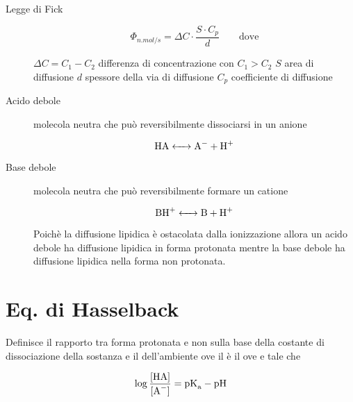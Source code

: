 
\begin{description}
\item[Legge di Fick]
$$ \Phi_{n.mol/s} = \Delta C \cdot \frac{S\cdot C_p}{d} \qquad\text{dove}$$

$\Delta C = C_1 - C_2$ differenza di concentrazione con $C_1 > C_2$\newline
$S$ area di diffusione\newline
$d$ spessore della via di diffusione\newline
$C_p$ coefficiente di diffusione

\item[Acido debole] molecola neutra che può reversibilmente dissociarsi in un anione 

$$\ce{HA <-> A- + H+}$$

\item[Base debole] molecola neutra che può reversibilmente formare un catione

$$\ce{BH+ <-> B + H+}$$

Poichè la diffusione lipidica è ostacolata dalla ionizzazione allora un acido debole ha diffusione lipidica in forma protonata mentre la base debole ha diffusione lipidica nella forma non protonata.

\end{description}

\section{Eq. di Hasselback}

Definisce il rapporto tra forma protonata e non sulla base della costante di dissociazione  della sostanza e il  dell'ambiente ove il  è il  ove \ce{[HA] = [A-]} e tale che

$$\log\frac{\ce{[HA]}}{\ce{[A^-]}} = \ce{pK_a} - \ce{pH}$$

